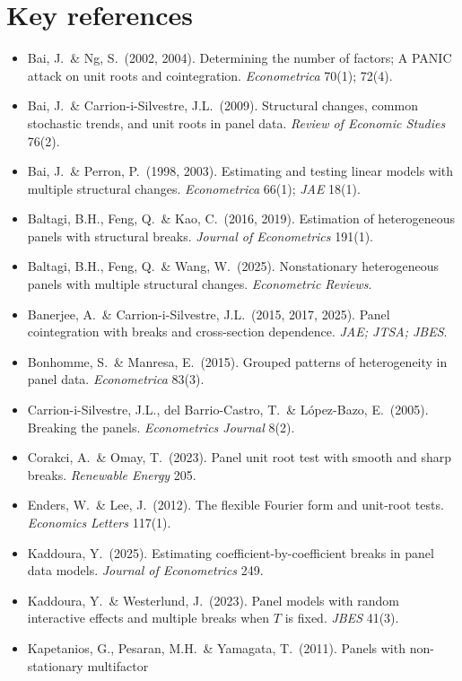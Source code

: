 \documentclass[11pt,a4paper]{article}
\theoremstyle{definition}
\begin{document}
\section*{Key references}
\small
\begin{itemize}[leftmargin=1.2em,itemsep=1pt]
 \item Bai, J.\ \& Ng, S.\ (2002, 2004). Determining the number of factors; A PANIC attack on unit
 roots and cointegration. \emph{Econometrica} 70(1); 72(4).
 \item Bai, J.\ \& Carrion-i-Silvestre, J.L.\ (2009). Structural changes, common stochastic trends,
 and unit roots in panel data. \emph{Review of Economic Studies} 76(2).
 \item Bai, J.\ \& Perron, P.\ (1998, 2003). Estimating and testing linear models with multiple
 structural changes. \emph{Econometrica} 66(1); \emph{JAE} 18(1).
 \item Baltagi, B.H., Feng, Q.\ \& Kao, C.\ (2016, 2019). Estimation of heterogeneous panels with
 structural breaks. \emph{Journal of Econometrics} 191(1).
 \item Baltagi, B.H., Feng, Q.\ \& Wang, W.\ (2025). Nonstationary heterogeneous panels with multiple
 structural changes. \emph{Econometric Reviews}.
 \item Banerjee, A.\ \& Carrion-i-Silvestre, J.L.\ (2015, 2017, 2025). Panel cointegration with breaks
 and cross-section dependence. \emph{JAE; JTSA; JBES}.
 \item Bonhomme, S.\ \& Manresa, E.\ (2015). Grouped patterns of heterogeneity in panel data.
 \emph{Econometrica} 83(3).
 \item Carrion-i-Silvestre, J.L., del Barrio-Castro, T.\ \& L\'opez-Bazo, E.\ (2005). Breaking the
 panels. \emph{Econometrics Journal} 8(2).
 \item Corakci, A.\ \& Omay, T.\ (2023). Panel unit root test with smooth and sharp breaks.
 \emph{Renewable Energy} 205.
 \item Enders, W.\ \& Lee, J.\ (2012). The flexible Fourier form and unit-root tests.
 \emph{Economics Letters} 117(1).
 \item Kaddoura, Y.\ (2025). Estimating coefficient-by-coefficient breaks in panel data models.
 \emph{Journal of Econometrics} 249.
 \item Kaddoura, Y.\ \& Westerlund, J.\ (2023). Panel models with random interactive effects and
 multiple breaks when $T$ is fixed. \emph{JBES} 41(3).
 \item Kapetanios, G., Pesaran, M.H.\ \& Yamagata, T.\ (2011). Panels with non-stationary multifactor

\end{itemize}
\end{document}
